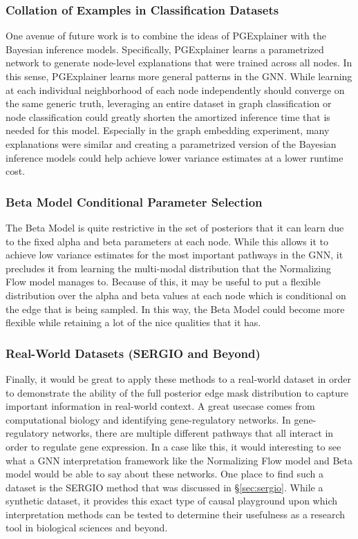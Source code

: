 \subsubsection{Collation of Examples in Classification Datasets}
One avenue of future work is to combine the ideas of PGExplainer \cite{luo_parameterized_2020} with the Bayesian inference models. Specifically, PGExplainer learns a parametrized network to generate node-level explanations that were trained across all nodes. In this sense, PGExplainer learns more general patterns in the GNN. While learning at each individual neighborhood of each node independently should converge on the same generic truth, leveraging an entire dataset in graph classification or node classification could greatly shorten the amortized inference time that is needed for this model. Especially in the graph embedding experiment, many explanations were similar and creating a parametrized version of the Bayesian inference models could help achieve lower variance estimates at a lower runtime cost.

\subsubsection{Beta Model Conditional Parameter Selection}
The Beta Model is quite restrictive in the set of posteriors that it can learn due to the fixed alpha and beta parameters at each node. While this allows it to achieve low variance estimates for the most important pathways in the GNN, it precludes it from learning the multi-modal distribution that the Normalizing Flow model manages to. Because of this, it may be useful to put a flexible distribution over the alpha and beta values at each node which is conditional on the edge that is being sampled. In this way, the Beta Model could become more flexible while retaining a lot of the nice qualities that it has. 

\subsubsection{Real-World Datasets (SERGIO and Beyond)}
Finally, it would be great to apply these methods to a real-world dataset in order to demonstrate the ability of the full posterior edge mask distribution to capture important information in real-world context. A great usecase comes from computational biology and identifying gene-regulatory networks. In gene-regulatory networks, there are multiple different pathways that all interact in order to regulate gene expression. In a case like this, it would interesting to see what a GNN interpretation framework like the Normalizing Flow model and Beta model would be able to say about these networks. One place to find such a dataset is the SERGIO \cite{dibaeinia_sergio_2020} method that was discussed in \S\ref{sec:sergio}. While a synthetic dataset, it provides this exact type of causal playground upon which interpretation methods can be tested to determine their usefulness as a research tool in biological sciences and beyond.

\newpage

